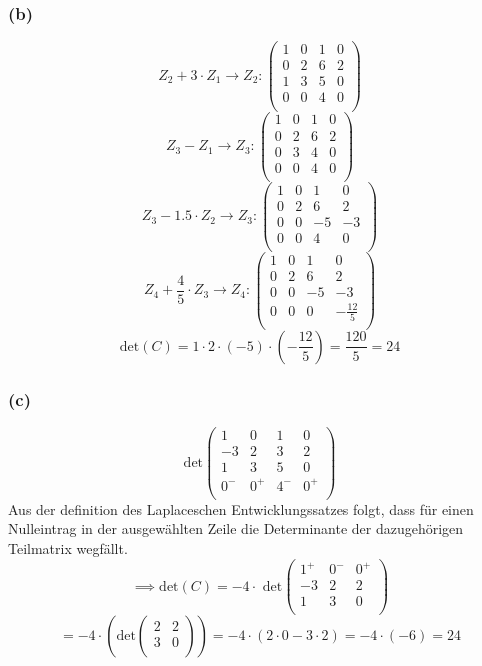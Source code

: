 \documentclass{article}
\begin{document}
\subsubsection{(b)}
\[Z_2 + 3 \cdot Z_1 \to Z_2: \begin{pmatrix}
    1 & 0 & 1 & 0 \\
    0 & 2 & 6 & 2 \\
    1 & 3 & 5 & 0 \\
    0 & 0 & 4 & 0 \\
\end{pmatrix}\]
\[Z_3 - Z_1 \to Z_3: \begin{pmatrix}
    1 & 0 & 1 & 0 \\
    0 & 2 & 6 & 2 \\
    0 & 3 & 4 & 0 \\
    0 & 0 & 4 & 0 \\
\end{pmatrix}\]
\[Z_3 - 1.5 \cdot Z_2 \to Z_3: \begin{pmatrix}
    1 & 0 & 1 & 0 \\
    0 & 2 & 6 & 2 \\
    0 & 0 & -5 & -3 \\
    0 & 0 & 4 & 0 \\
\end{pmatrix}\]
\[Z_4 + \frac{4}{5} \cdot Z_3 \to Z_4: \begin{pmatrix}
    1 & 0 & 1 & 0 \\
    0 & 2 & 6 & 2 \\
    0 & 0 & -5 & -3 \\
    0 & 0 & 0 & -\frac{12}{5} \\
\end{pmatrix}\]
\[\text{det}(C) = 1 \cdot 2 \cdot (-5) \cdot (-\frac{12}{5}) = \frac{120}{5} = 24\]
\subsubsection{(c)}
\[\text{det}\begin{pmatrix}
    1 & 0 & 1 & 0 \\
    -3 & 2 & 3 & 2 \\
    1 & 3 & 5 & 0 \\
    0^- & 0^+ & 4^- & 0^+ \\
\end{pmatrix}\]
Aus der definition des Laplaceschen Entwicklungssatzes folgt, dass für einen Nulleintrag in der ausgewählten Zeile die Determinante der dazugehörigen Teilmatrix wegfällt.
\[\implies \text{det}(C) = -4 \cdot \text{ det}\begin{pmatrix}
    1^+ & 0^- & 0^+ \\
    -3 & 2 & 2 \\
    1 &3  & 0 \\
\end{pmatrix}\]
\[= -4 \cdot (\text{det}\begin{pmatrix}
    2 & 2 \\
    3 & 0 \\
\end{pmatrix}) = -4 \cdot (2 \cdot 0 - 3 \cdot 2) = -4 \cdot (-6) = 24\]
\end{document}
